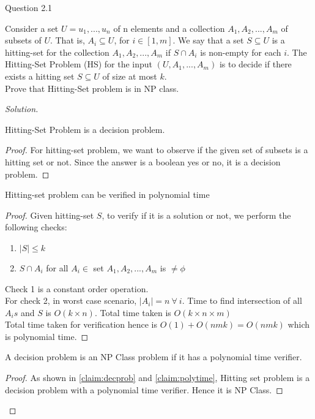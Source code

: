 \begin{solution}{Question 2.1}\label{ques:21}
    \begin{question}
    Consider a set $U = {u_1, . . . , u_n}$ of n elements and a collection $A_1, A_2, . . . , A_m$ of subsets of $U$. That is, $A_i \subseteq U $, for $ i \in [1, m]$. We say that a set $S \subseteq U$ is a hitting-set for the collection $A_1, A_2, . . . , A_m$ if $S \cap A_i$ is non-empty for each $i$. The Hitting-Set Problem (HS) for the input $(U, A_1, . . . , A_m)$ is to decide if there exists a hitting set $S \subseteq U$ of size at most $k$.\\
    Prove that Hitting-Set problem is in NP class.

    \end{question}
    \tcblower{}
    \begin{proof}[Solution]
    \begin{claim} \label{claim:decprob}
    Hitting-Set Problem is a decision problem.
    \end{claim}
    \begin{proof}
    For hitting-set problem, we want to observe if the given set of subsets is a hitting set or not. Since the answer is a boolean yes or no, it is a decision problem.
    \end{proof}
    
    \begin{claim} \label{claim:polytime}
    Hitting-set problem can be verified in polynomial time 
    \end{claim}
    \begin{proof}
    Given hitting-set $S$, to verify if it is a solution or not, we perform the following checks:
    \begin{enumerate}
        \item $|S| \leq k $
        \item $S \cap A_i$ for all $A_i \in$ set $A_1, A_2, . . . , A_m$ is $\neq \phi$
    \end{enumerate}
    Check 1 is a constant order operation.\\
    For check 2, in worst case scenario, $|A_i|=n \ \forall \ i$. Time to find intersection of all $A_{i}s$ and $S$ is $O(k \times n)$. Total time taken is $O(k \times n \times m)$\\
    Total time taken for verification hence is $O(1)+O(nmk) = O(nmk)$ which is polynomial time.
    \end{proof}
    
    \begin{claim}
    A decision problem is an NP Class problem if it has a polynomial time verifier.
    \end{claim}
    \begin{proof}
    As shown in \ref{claim:decprob} and \ref{claim:polytime}, Hitting set problem is a decision problem with a polynomial time verifier. Hence it is NP Class.
    \end{proof}
    
    \end{proof}
\end{solution}

